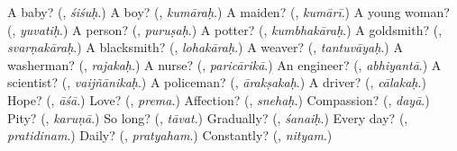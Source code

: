 \begin{tcolorbox}[breakable,colback=teal!4,colframe=teal!35!black,title={Before you move on}]
A baby? (\textbf{}, \emph{śiśuḥ}.) A boy? (\textbf{}, \emph{kumāraḥ}.) A maiden? (\textbf{}, \emph{kumārī}.) A young woman? (\textbf{}, \emph{yuvatiḥ}.) A person? (\textbf{}, \emph{puruṣaḥ}.) A potter? (\textbf{}, \emph{kumbhakāraḥ}.) A goldsmith? (\textbf{}, \emph{svarṇakāraḥ}.) A blacksmith? (\textbf{}, \emph{lohakāraḥ}.) A weaver? (\textbf{}, \emph{tantuvāyaḥ}.) A washerman? (\textbf{}, \emph{rajakaḥ}.) A nurse? (\textbf{}, \emph{paricārikā}.) An engineer? (\textbf{}, \emph{abhiyantā}.) A scientist? (\textbf{}, \emph{vaijñānikaḥ}.) A policeman? (\textbf{}, \emph{ārakṣakaḥ}.) A driver? (\textbf{}, \emph{cālakaḥ}.) Hope? (\textbf{}, \emph{āśā}.) Love? (\textbf{}, \emph{prema}.) Affection? (\textbf{}, \emph{snehaḥ}.) Compassion? (\textbf{}, \emph{dayā}.) Pity? (\textbf{}, \emph{karuṇā}.) So long? (\textbf{}, \emph{tāvat}.) Gradually? (\textbf{}, \emph{śanaiḥ}.) Every day? (\textbf{}, \emph{pratidinam}.) Daily? (\textbf{}, \emph{pratyaham}.) Constantly? (\textbf{}, \emph{nityam}.)
\end{tcolorbox}
